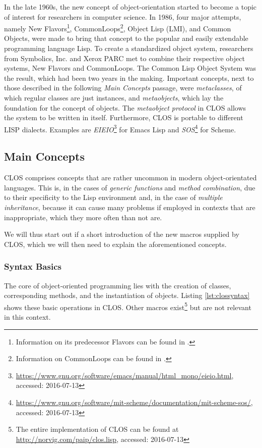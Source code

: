 \documentclass[oribibl]{llncs}
\begin{document}
In the late 1960s, the new concept of object-orientation started to become a topic of interest for researchers in computer science. In 1986, four major attempts, namely New Flavors\footnote{Information on its predecessor Flavors can be found in \cite{Moon:1986:OPF:28697.28698}.}, CommonLoops\footnote{Information on CommonLoops can be found in \cite{Bobrow:1986:CML:28697.28700}.}, Object Lisp (LMI), and Common Objects, were made to bring that concept to the popular and easily extendable programming language Lisp. \cite{steele1993evolution} To create a standardized object system, researchers from Symbolics, Inc. and Xerox PARC met to combine their respective object systems, New Flavors and CommonLoops. \cite{demichiel1987common} The Common Lisp Object System was the result, which had been two years in the making. \cite{steele1993evolution} Important concepts, next to those described in the following \emph{Main Concepts} passage, were \emph{metaclasses}, of which regular classes are just instances, and \emph{metaobjects}, which lay the foundation for the concept of objects. \cite{kiczales1991art} The \emph{metaobject protocol} in CLOS allows the system to be written in itself. \cite{steele1993evolution} Furthermore, CLOS is portable to different LISP dialects. Examples are \emph{EIEIO}\footnote{\url{https://www.gnu.org/software/emacs/manual/html_mono/eieio.html}, accessed: 2016-07-13} for Emacs Lisp and \emph{SOS}\footnote{\url{https://www.gnu.org/software/mit-scheme/documentation/mit-scheme-sos/}, accessed: 2016-07-13} for Scheme.



\subsection{Main Concepts}
\label{sec:concepts}

CLOS comprises concepts that are rather uncommon in modern object-orientated languages. This is, in the cases of \emph{generic functions} and \emph{method combination}, due to their specificity to the Lisp environment and, in the case of \emph{multiple inheritance}, because it can cause many problems if employed in contexts that are inappropriate, which they more often than not are. \cite{XXX} 

We will thus start out if a short introduction of the new macros supplied by CLOS, which we will then need to explain the aforementioned concepts.


\subsubsection{Syntax Basics}
The core of object-oriented programming lies with the creation of classes, corresponding methods, and the instantiation of objects. Listing \ref{lst:clossyntax} shows these basic operations in CLOS. Other macros exist\footnote{The entire implementation of CLOS can be found at \url{http://norvig.com/paip/clos.lisp}, accessed: 2016-07-13} but are not relevant in this context.
\end{document}
